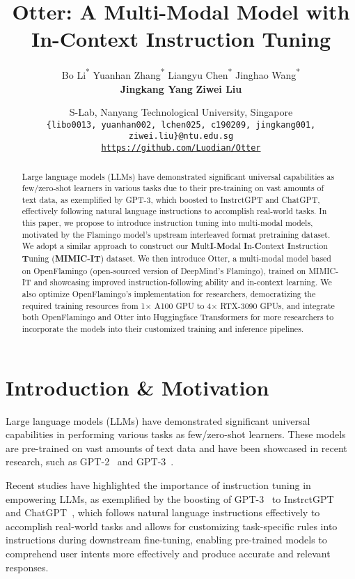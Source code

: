 \documentclass{article}
\title{Otter: A Multi-Modal Model with In-Context Instruction Tuning}
\author{
Bo Li\textsuperscript{*} \quad Yuanhan Zhang\textsuperscript{*} \quad Liangyu Chen\textsuperscript{*} \quad Jinghao Wang\textsuperscript{*} \\
\textbf{Jingkang Yang} \quad \textbf{Ziwei Liu}\textsuperscript{\Letter}
\and
S-Lab, Nanyang Technological University, Singapore\\
{\tt\small\{libo0013, yuanhan002, lchen025, c190209, jingkang001, ziwei.liu\}@ntu.edu.sg}\\
{\tt\small\url{https://github.com/Luodian/Otter}}
}
\begin{document}
\maketitle
\def\thefootnote{*}\def\thefootnote{\arabic{footnote}}
\def\thefootnote{\Letter}\def\thefootnote{\arabic{footnote}}
\begin{abstract}
Large language models (LLMs) have demonstrated significant universal capabilities as few/zero-shot learners in various tasks due to their pre-training on vast amounts of text data, as exemplified by GPT-3, which boosted to InstrctGPT and ChatGPT, effectively following natural language instructions to accomplish real-world tasks. In this paper, we propose to introduce instruction tuning into multi-modal models, motivated by the Flamingo model's upstream interleaved format pretraining dataset. We adopt a similar approach to construct our \textbf{M}ult\textbf{I}-\textbf{M}odal \textbf{I}n-\textbf{C}ontext \textbf{I}nstruction \textbf{T}uning (\textbf{MIMIC-IT}) dataset. We then introduce Otter, a multi-modal model based on OpenFlamingo (open-sourced version of DeepMind's Flamingo), trained on MIMIC-IT and showcasing improved instruction-following ability and in-context learning. We also optimize OpenFlamingo's implementation for researchers, democratizing the required training resources from 1$\times$ A100 GPU to 4$\times$ RTX-3090 GPUs, and integrate both OpenFlamingo and Otter into Huggingface Transformers for more researchers to incorporate the models into their customized training and inference pipelines.

\end{abstract}

\section{Introduction \& Motivation}





Large language models (LLMs) have demonstrated significant universal capabilities in performing various tasks as few/zero-shot learners. These models are pre-trained on vast amounts of text data and have been showcased in recent research, such as GPT-2~\cite{gpt2} and GPT-3~\cite{gpt3}. 

Recent studies have highlighted the importance of instruction tuning in empowering LLMs, as exemplified by the boosting of GPT-3~\cite{gpt3} to InstrctGPT~\cite{instruct_gpt} and ChatGPT~\cite{chatgpt}, which follows natural language instructions effectively to accomplish real-world tasks and allows for customizing task-specific rules into instructions during downstream fine-tuning, enabling pre-trained models to comprehend user intents more effectively and produce accurate and relevant responses.
\end{document}
